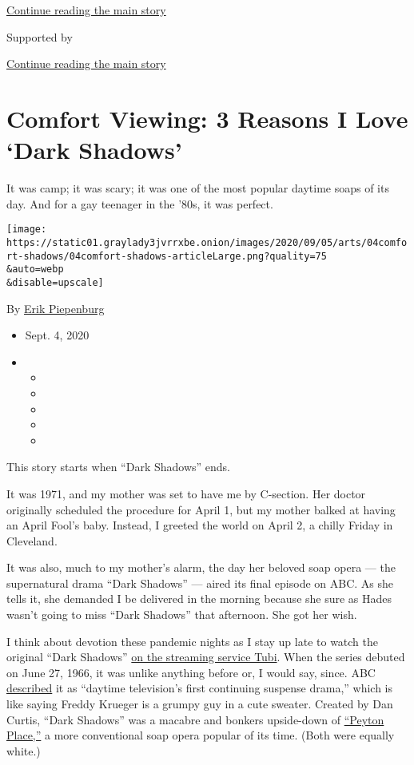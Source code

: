 \protect\hyperlink{after-top}{Continue reading the main story}

Supported by

\protect\hyperlink{after-sponsor}{Continue reading the main story}

\hypertarget{comfort-viewing-3-reasons-i-love-dark-shadows}{%
\section{Comfort Viewing: 3 Reasons I Love `Dark
Shadows'}\label{comfort-viewing-3-reasons-i-love-dark-shadows}}

It was camp; it was scary; it was one of the most popular daytime soaps
of its day. And for a gay teenager in the '80s, it was perfect.

\texttt{[image: https://static01.graylady3jvrrxbe.onion/images/2020/09/05/arts/04comfort-shadows/04comfort-shadows-articleLarge.png?quality=75\\\&auto=webp\\\&disable=upscale]}

By \href{https://www.nytimes3xbfgragh.onion/by/erik-piepenburg}{Erik
Piepenburg}

\begin{itemize}
\item
  Sept. 4, 2020
\item
  \begin{itemize}
  \item
  \item
  \item
  \item
  \item
  \end{itemize}
\end{itemize}

This story starts when ``Dark Shadows'' ends.

It was 1971, and my mother was set to have me by C-section. Her doctor
originally scheduled the procedure for April 1, but my mother balked at
having an April Fool's baby. Instead, I greeted the world on April 2, a
chilly Friday in Cleveland.

It was also, much to my mother's alarm, the day her beloved soap opera
--- the supernatural drama ``Dark Shadows'' --- aired its final episode
on ABC. As she tells it, she demanded I be delivered in the morning
because she sure as Hades wasn't going to miss ``Dark Shadows'' that
afternoon. She got her wish.

I think about devotion these pandemic nights as I stay up late to watch
the original ``Dark Shadows''
\href{https://tubitv.com/series/4638/dark_shadows}{on the streaming
service Tubi}. When the series debuted on June 27, 1966, it was unlike
anything before or, I would say, since. ABC
\href{https://www.youtube.com/watch?v=oYlrxfOf3S4}{described} it as
``daytime television's first continuing suspense drama,'' which is like
saying Freddy Krueger is a grumpy guy in a cute sweater. Created by Dan
Curtis, ``Dark Shadows'' was a macabre and bonkers upside-down of
\href{https://www.nytimes3xbfgragh.onion/2009/07/19/arts/television/19karp.html}{``Peyton
Place,''} a more conventional soap opera popular of its time. (Both were
equally white.)

